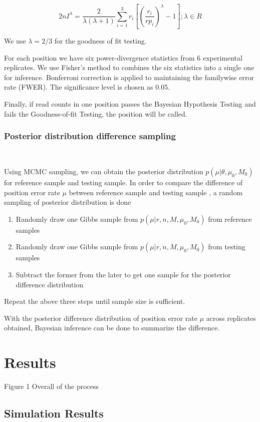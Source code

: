 \documentclass[11pt,reqno]{amsart}
\begin{document}
\begin{equation}
 2nI^\lambda = \frac{2}{\lambda(\lambda+1)}\sum_{i=1}^3 r_i \left[\left(\frac{r_i}{rp_i}\right)^\lambda-1\right];\lambda \in R
\end{equation}

We use $\lambda =2/3$ for the goodness of fit testing.

For each position we have six power-divergence statistics from 6 experimental replicates. We use Fisher's method to combines the six statistics into a single one for inference. Bonferroni correction is applied to maintaining the familywise error rate (FWER). The significance level is chosen as 0.05.

Finally, if read counts in one position passes the Bayesian Hypothesis Testing and fails the Goodness-of-fit Testing, the position will be called.


\subsubsection{Posterior distribution difference sampling}\

Using MCMC sampling, we can obtain the posterior distribution $p \left( \mu |\theta,\mu_0,M_0\right)$ for reference sample and testing sample. In order to compare the difference of position error rate $\mu$ between reference sample and testing sample , a random sampling of posterior distribution is done 

\begin{enumerate}
 \item Randomly  draw one Gibbs sample from $p \left( \mu |r, n, M, \mu_0, M_0\right)$ from reference samples
 \item Randomly draw one Gibbs sample from $p \left( \mu |r, n, M, \mu_0,M_0\right) $ from testing samples
 \item Subtract the former from the later to get one sample for the posterior difference distribution 
\end{enumerate}
Repeat the above three steps until sample size is sufficient.

With the posterior difference distribution of position error rate $\mu$ across replicates obtained, Bayesian inference can be done to summarize the difference. 


\section{Results}
Figure 1 Overall of the process
\subsection{Simulation Results}
\end{document}
